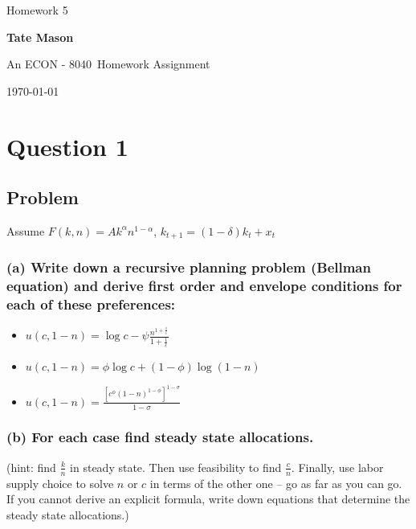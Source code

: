 \documentclass[10pt, a4paper]{article}
\newcommand\course{ECON - 8040}                            %
\newcommand\hwnumber{5}                                 %
\newcommand\Information{Tate Mason}                        %
\begin{document}
  \begin{titlepage}
    \begin{center}
      \vspace*{3cm}
            
        \vspace{1cm}
        \huge
        Homework \hwnumber
            
        \vspace{1.5cm}
        \Large
            
        \textbf{\Information}                      %
            
        \vfill
        
        \vspace{1cm}

        An \course \ Homework Assignment
            
        \vspace{1cm}
        \Large

        
        \today
            
    \end{center}
  \end{titlepage}

  \newpage
\section*{Question 1}
  \subsection*{Problem}
    Assume $F(k,n) = Ak^{\alpha}n^{1-\alpha}$, $k_{t+1} = (1-\delta)k_t + x_t$
    \subsubsection*{(a) Write down a recursive planning problem (Bellman equation) and derive first order and envelope conditions for each of these preferences:}
    \begin{itemize}
      \item $u(c,1-n) = \log c - \psi \frac{n^{1+\frac{1}{\epsilon}}}{1+\frac{1}{\epsilon}}$
      \item $u(c,1-n) = \phi \log c + (1-\phi) \log(1-n)$
      \item $u(c,1-n) = \frac{[c^{\phi}(1-n)^{1-\phi}]^{1-\sigma}}{1-\sigma}$
    \end{itemize}
    
    \subsubsection*{(b) For each case find steady state allocations.}
    (hint: find $\frac{k}{n}$ in steady state. Then use feasibility to find $\frac{c}{n}$. Finally, use labor supply choice to solve $n$ or $c$ in terms of the other one – go as far as you can go. If you cannot derive an explicit formula, write down equations that determine the steady state allocations.)
\end{document}
